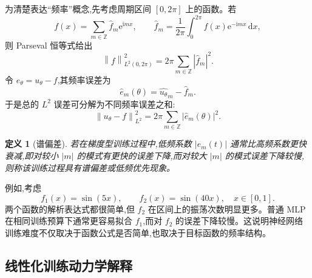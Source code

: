 \documentclass[12pt,hyperref,a4paper,UTF8,twoside]{ctexart}
\newtheorem{definition}{定义}
\newcommand{\dd}{\mathrm d}
\newcommand{\e}{\mathrm e}
\newcommand{\ii}{\mathrm i}
\newcommand{\norm}[1]{\left\lVert #1\right\rVert}
\begin{document}
为清楚表达“频率”概念,先考虑周期区间 $[0,2\pi]$ 上的函数。若
\begin{equation}\label{eq:fourier-series}
    f(x)=\sum_{m\in\mathbb Z}\widehat f_m\e^{\ii mx},
    \qquad
    \widehat f_m=\frac1{2\pi}\int_0^{2\pi} f(x)\e^{-\ii mx}\,\dd x,
\end{equation}
则 Parseval 恒等式给出
\begin{equation}\label{eq:parseval}
    \norm{f}_{L^2(0,2\pi)}^2=2\pi\sum_{m\in\mathbb Z}|\widehat f_m|^2.
\end{equation}
令 $e_\theta=u_\theta-f$,其频率误差为
\begin{equation}\label{eq:fourier-error}
    \widehat e_m(\theta)=\widehat{u_\theta}_m-\widehat f_m.
\end{equation}
于是总的 $L^2$ 误差可分解为不同频率误差之和:
\begin{equation}\label{eq:l2-frequency-decomposition}
    \norm{u_\theta-f}_{L^2}^2
    =2\pi\sum_{m\in\mathbb Z}|\widehat e_m(\theta)|^2.
\end{equation}

\begin{definition}[谱偏差]
若在梯度型训练过程中,低频系数 $|\widehat e_m(t)|$ 通常比高频系数更快衰减,即对较小 $|m|$ 的模式有更快的误差下降,而对较大 $|m|$ 的模式误差下降较慢,则称该训练过程具有谱偏差或低频优先现象。
\end{definition}

例如,考虑
\begin{equation}\label{eq:sin-example}
    f_1(x)=\sin(5x),\qquad f_2(x)=\sin(40x),\quad x\in[0,1].
\end{equation}
两个函数的解析表达式都很简单,但 $f_2$ 在区间上的振荡次数明显更多。普通 MLP 在相同训练预算下通常更容易拟合 $f_1$,而对 $f_2$ 的误差下降较慢。这说明神经网络训练难度不仅取决于函数公式是否简单,也取决于目标函数的频率结构。

\subsection{线性化训练动力学解释}
\end{document}
